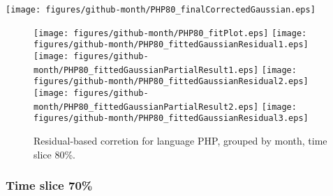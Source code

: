 \begin{center}
{\texttt{[image: figures/github-month/PHP80\_finalCorrectedGaussian.eps]}}
\end{center}

\FloatBarrier

\begin{figure}[t]
\centering
{}
{\texttt{[image: figures/github-month/PHP80\_fitPlot.eps]}}
{\texttt{[image: figures/github-month/PHP80\_fittedGaussianResidual1.eps]}}
{\texttt{[image: figures/github-month/PHP80\_fittedGaussianPartialResult1.eps]}}
{\texttt{[image: figures/github-month/PHP80\_fittedGaussianResidual2.eps]}}
{\texttt{[image: figures/github-month/PHP80\_fittedGaussianPartialResult2.eps]}}
{\texttt{[image: figures/github-month/PHP80\_fittedGaussianResidual3.eps]}}
\caption{Residual-based corretion for language PHP, grouped by month, time slice 80\%.}
\end{figure}


\FloatBarrier


\subsubsection{Time slice 70\%}

